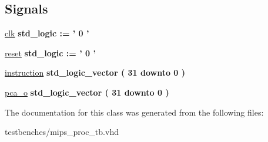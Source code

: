 \subsection*{\-Signals}
 \begin{DoxyCompactItemize}
\item 
\hypertarget{classmips__proc__tb_1_1behavior_a6732b1e05ec0cbac56a07dc48f391fd8}{\hyperlink{classmips__proc__tb_1_1behavior_a6732b1e05ec0cbac56a07dc48f391fd8}{clk} {\bfseries std\-\_\-logic  \-:= '  0  ' } }\label{classmips__proc__tb_1_1behavior_a6732b1e05ec0cbac56a07dc48f391fd8}

\item 
\hypertarget{classmips__proc__tb_1_1behavior_a1227312426e741edc82659864d673dd7}{\hyperlink{classmips__proc__tb_1_1behavior_a1227312426e741edc82659864d673dd7}{reset} {\bfseries std\-\_\-logic  \-:= '  0  ' } }\label{classmips__proc__tb_1_1behavior_a1227312426e741edc82659864d673dd7}

\item 
\hypertarget{classmips__proc__tb_1_1behavior_a46c7e46ecf9add8594bee7c639ee1fe1}{\hyperlink{classmips__proc__tb_1_1behavior_a46c7e46ecf9add8594bee7c639ee1fe1}{instruction} {\bfseries std\-\_\-logic\-\_\-vector (   31    downto    0  ) } }\label{classmips__proc__tb_1_1behavior_a46c7e46ecf9add8594bee7c639ee1fe1}

\item 
\hypertarget{classmips__proc__tb_1_1behavior_a9ab65ec266e93aca6fc7f8ce688f92bf}{\hyperlink{classmips__proc__tb_1_1behavior_a9ab65ec266e93aca6fc7f8ce688f92bf}{pca\-\_\-o} {\bfseries std\-\_\-logic\-\_\-vector (   31    downto    0  ) } }\label{classmips__proc__tb_1_1behavior_a9ab65ec266e93aca6fc7f8ce688f92bf}

\end{DoxyCompactItemize}


\-The documentation for this class was generated from the following files\-:\begin{DoxyCompactItemize}
\item 
testbenches/mips\-\_\-proc\-\_\-tb.\-vhd\end{DoxyCompactItemize}
